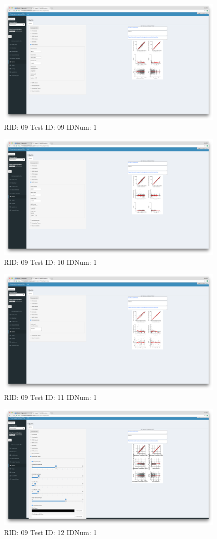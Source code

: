 \begin{figure}[H]
\includegraphics[width=.8\textwidth]{screencaps/09-09-1.png}
\caption{RID: 09 Test ID: 09 IDNum: 1}
\end{figure}
\begin{figure}[H]
\includegraphics[width=.8\textwidth]{screencaps/09-10-1.png}
\caption{RID: 09 Test ID: 10 IDNum: 1}
\end{figure}
\begin{figure}[H]
\includegraphics[width=.8\textwidth]{screencaps/09-11-1.png}
\caption{RID: 09 Test ID: 11 IDNum: 1}
\end{figure}
\begin{figure}[H]
\includegraphics[width=.8\textwidth]{screencaps/09-12-1.png}
\caption{RID: 09 Test ID: 12 IDNum: 1}
\end{figure}
